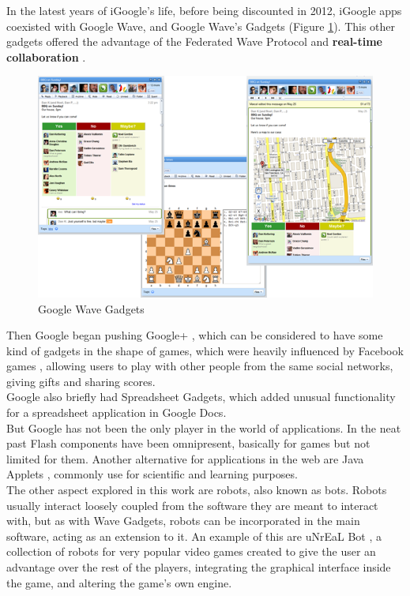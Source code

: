 In the latest years of iGoogle's life, before being discounted in 2012, iGoogle apps coexisted with Google Wave, and Google Wave's Gadgets (Figure \ref{fig:wave_gadgets}). This other gadgets offered the advantage of the Federated Wave Protocol \cite{ref:wave_federation_protocol} and \textbf{real-time collaboration} \cite{ref:apache_wave_about}.\\[.2cm]
\begin{figure}[h]
  \center
    \includegraphics[keepaspectratio, scale=0.5]{Media/Captures/Soa/WaveGadgets.png}
  \caption{Google Wave Gadgets}
  \label{fig:wave_gadgets}
\end{figure}
Then Google began pushing Google+ \cite{ref:google_plus}, which can be considered to have some kind of gadgets in the shape of games, which were heavily influenced by Facebook games \cite{ref:facebook_games}, allowing users to play with other people from the same social networks, giving gifts and sharing scores.\\[.2cm]
Google also briefly had Spreadsheet Gadgets, which added unusual functionality for a spreadsheet application in Google Docs.\\[.2cm]
But Google has not been the only player in the world of applications. In the neat past Flash \cite{ref:adobe_flash} components have been omnipresent, basically for games but not limited for them. Another alternative for applications in the web are Java Applets \cite{ref:java_applets}, commonly use for scientific and learning purposes.\\[.2cm]
The other aspect explored in this work are robots, also known as bots. Robots usually interact loosely coupled from the software they are meant to interact with, but as with Wave Gadgets, robots can be incorporated in the main software, acting as an extension to it. An example of this are uNrEaL Bot \cite{ref:unreal_bot}, a collection of robots for very popular video games created to give the user an advantage over the rest of the players, integrating the graphical interface inside the game, and altering the game's own engine.\\[.2cm]
